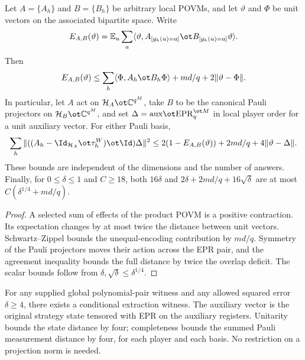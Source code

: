 \begin{lemma}
  \label{lem:qld-pauli-overlap-state-transfer}
  \leanok
  Let $A=\{A_h\}$ and $B=\{B_h\}$ be arbitrary local POVMs, and let
  $\vartheta$ and $\Phi$ be unit vectors on the associated bipartite space.
  Write
  \[
    E_{A,B}(\vartheta)=\mathbb E_u\sum_a
      \langle\vartheta,A_{[g_h(u)=a]}\ot B_{[g_h(u)=a]}\vartheta\rangle.
  \]
  Then
  \[
    E_{A,B}(\vartheta)
    \leq \sum_h\langle\Phi,A_h\ot B_h\Phi\rangle
      +md/q+2\|\vartheta-\Phi\|.
  \]
  In particular, let $A$ act on
  $\mathcal H_A\ot\mathbb C^{q^M}$, take $B$ to be the canonical Pauli
  projectors on $\mathcal H_B\ot\mathbb C^{q^M}$, and set
  $\Delta=\mathrm{aux}\ot\mathrm{EPR}_q^{\ot M}$ in local player order for a
  unit auxiliary vector. For either Pauli basis,
  \[
    \sum_h\|((A_h-\Id_{\mathcal H_A}\ot\tau^W_h)\ot\Id)\Delta\|^2
    \leq 2(1-E_{A,B}(\vartheta))+2md/q+4\|\vartheta-\Delta\|.
  \]
  These bounds are independent of the dimensions and the number of answers.
  Finally, for $0\leq\delta\leq1$ and $C\geq18$, both $16\delta$ and
  $2\delta+2md/q+16\sqrt\delta$ are at most $C(\delta^{1/4}+md/q)$.
\end{lemma}
\begin{proof}
  \leanok
  A selected sum of effects of the product POVM is a positive contraction.
  Its expectation changes by at most twice the distance between unit vectors.
  Schwartz--Zippel bounds the unequal-encoding contribution by $md/q$.
  Symmetry of the Pauli projectors moves their action across the EPR pair,
  and the agreement inequality bounds the full distance by twice the overlap
  deficit. The scalar bounds follow from $\delta,\sqrt\delta\leq\delta^{1/4}$.
\end{proof}

\begin{example}
	\label{lem:qld-large-error-extraction-given-global-pair}
	\leanok
	For any supplied global polynomial-pair witness and any allowed squared
	error $\delta\geq4$, there exists a conditional extraction witness.
	The auxiliary vector is the original strategy state tensored with EPR on
	the auxiliary registers. Unitarity bounds the state distance by four;
	completeness bounds the summed Pauli measurement distance by four, for
	each player and each basis. No restriction on a projection norm is needed.
\end{example}

